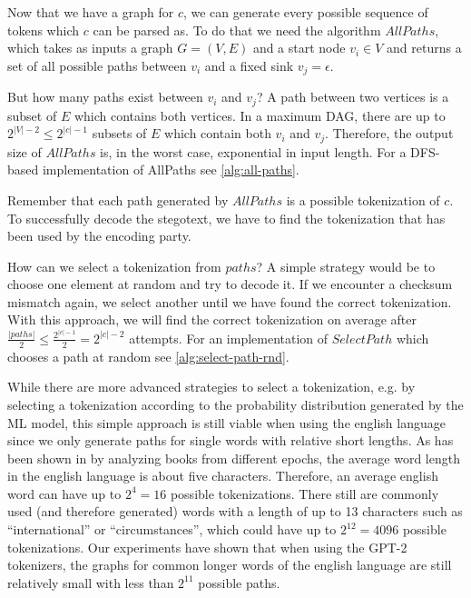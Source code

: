Now that we have a graph for $c$, we can generate every possible sequence of tokens which $c$ can be parsed as.
To do that we need the algorithm $AllPaths$, which takes as inputs a graph $G = (V, E)$ and a start node $v_i \in V$ and returns a set of all possible paths between $v_i$ and a fixed sink $v_j = \epsilon$.

But how many paths exist between $v_i$ and $v_j$?
A path between two vertices is a subset of $E$ which contains both vertices.
In a maximum DAG, there are up to $2^{|V|-2} \leq 2^{|c|-1}$ subsets of $E$ which contain both $v_i$ and $v_j$.
Therefore, the output size of $AllPaths$ is, in the worst case, exponential in input length.
For a DFS-based implementation of AllPaths see \autoref{alg:all-paths}.

Remember that each path generated by $AllPaths$ is a possible tokenization of $c$.
To successfully decode the stegotext, we have to find the tokenization that has been used by the encoding party.

How can we select a tokenization from $paths$?
A simple strategy would be to choose one element at random and try to decode it.
If we encounter a checksum mismatch again, we select another until we have found the correct tokenization.
With this approach, we will find the correct tokenization on average after $\frac{|paths|}{2} \leq \frac{2^{|c|-1}}{2} = 2^{|c|-2}$ attempts.
For an implementation of $SelectPath$ which chooses a path at random see \autoref{alg:select-path-rnd}.

While there are more advanced strategies to select a tokenization, e.g. by selecting a tokenization according to the probability distribution generated by the ML model, this simple approach is still viable when using the english language since we only generate paths for single words with relative short lengths.
As has been shown in \cite{BoShSo2012} by analyzing books from different epochs, the average word length in the english language is about five characters.
Therefore, an average english word can have up to $2^4 = 16$ possible tokenizations.
There still are commonly used (and therefore generated) words with a length of up to 13 characters such as ``international'' or ``circumstances'', which could have up to $2^{12} = 4096$ possible tokenizations.
Our experiments have shown that when using the GPT-2 tokenizers, the graphs for common longer words of the english language are still relatively small with less than $2^{11}$ possible paths.



